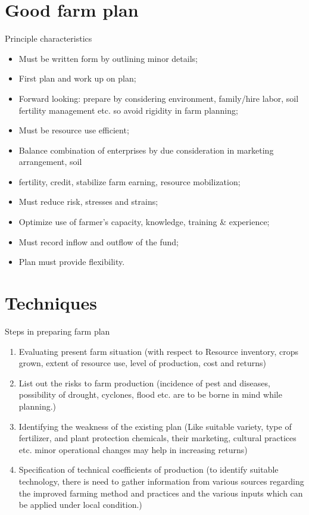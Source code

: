 \documentclass[12pt,ignorenonframetext,aspectratio=169]{beamer}
\providecommand{\tightlist}{%
  \setlength{\itemsep}{0pt}\setlength{\parskip}{0pt}}
\begin{document}
\hypertarget{good-farm-plan}{%
\section{Good farm plan}\label{good-farm-plan}}

\begin{frame}{Principle characteristics}
\protect\hypertarget{principle-characteristics}{}
\begin{itemize}
\tightlist
\item
  Must be written form by outlining minor details;
\item
  First plan and work up on plan;
\item
  Forward looking: prepare by considering environment, family/hire
  labor, soil fertility management etc. so avoid rigidity in farm
  planning;
\item
  Must be resource use efficient;
\item
  Balance combination of enterprises by due consideration in marketing
  arrangement, soil
\item
  fertility, credit, stabilize farm earning, resource mobilization;
\item
  Must reduce risk, stresses and strains;
\item
  Optimize use of farmer's capacity, knowledge, training \& experience;
\item
  Must record inflow and outflow of the fund;
\item
  Plan must provide flexibility.
\end{itemize}
\end{frame}

\hypertarget{techniques}{%
\section{Techniques}\label{techniques}}

\begin{frame}{Steps in preparing farm plan}
\protect\hypertarget{steps-in-preparing-farm-plan}{}
\begin{enumerate}
\tightlist
\item
  Evaluating present farm situation (with respect to Resource inventory,
  crops grown, extent of resource use, level of production, cost and
  returns)
\item
  List out the risks to farm production (incidence of pest and diseases,
  possibility of drought, cyclones, flood etc. are to be borne in mind
  while planning.)
\item
  Identifying the weakness of the existing plan (Like suitable variety,
  type of fertilizer, and plant protection chemicals, their marketing,
  cultural practices etc. minor operational changes may help in
  increasing returns)
\item
  Specification of technical coefficients of production (to identify
  suitable technology, there is need to gather information from various
  sources regarding the improved farming method and practices and the
  various inputs which can be applied under local condition.)
\end{enumerate}
\end{frame}
\end{document}
